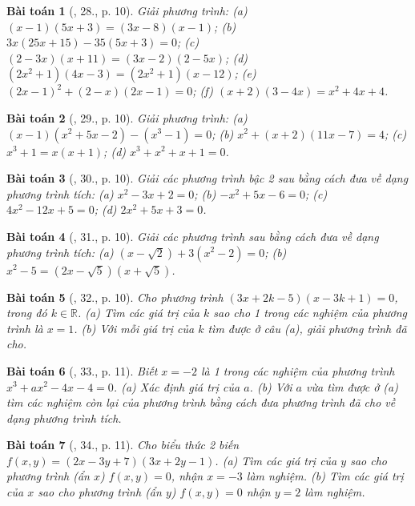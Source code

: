 \documentclass{article}
\newtheorem{baitoan}{Bài toán}
\begin{document}
\begin{baitoan}[\cite{SBT_Toan_8_tap_2}, 28., p. 10]
	Giải phương trình: (a) $(x - 1)(5x + 3) = (3x - 8)(x - 1)$; (b) $3x(25x + 15) - 35(5x + 3) = 0$; (c) $(2 - 3x)(x + 11) = (3x - 2)(2 - 5x)$; (d) $(2x^2 + 1)(4x - 3) = (2x^2 + 1)(x - 12)$; (e) $(2x - 1)^2 + (2 - x)(2x - 1) = 0$; (f) $(x + 2)(3 - 4x) = x^2 + 4x + 4$.
\end{baitoan}

\begin{baitoan}[\cite{SBT_Toan_8_tap_2}, 29., p. 10]
	Giải phương trình: (a) $(x - 1)(x^2 + 5x - 2) - (x^3 - 1) = 0$; (b) $x^2 + (x + 2)(11x - 7) = 4$; (c) $x^3 + 1 = x(x + 1)$; (d) $x^3 + x^2 + x + 1 = 0$.
\end{baitoan}

\begin{baitoan}[\cite{SBT_Toan_8_tap_2}, 30., p. 10]
	Giải các phương trình bậc 2 sau bằng cách đưa về dạng phương trình tích: (a) $x^2 - 3x + 2 = 0$; (b) $-x^2 + 5x - 6 = 0$; (c) $4x^2 - 12x + 5 = 0$; (d) $2x^2 + 5x + 3 = 0$.
\end{baitoan}

\begin{baitoan}[\cite{SBT_Toan_8_tap_2}, 31., p. 10]
	Giải các phương trình sau bằng cách đưa về dạng phương trình tích: (a) $(x - \sqrt{2}) + 3(x^2 - 2) = 0$; (b) $x^2 - 5 = (2x - \sqrt{5})(x + \sqrt{5})$.
\end{baitoan}

\begin{baitoan}[\cite{SBT_Toan_8_tap_2}, 32., p. 10]
	Cho phương trình $(3x + 2k - 5)(x - 3k + 1) = 0$, trong đó $k\in\mathbb{R}$. (a) Tìm các giá trị của $k$ sao cho 1 trong các nghiệm của phương trình là $x = 1$. (b) Với mỗi giá trị của $k$ tìm được ở câu (a), giải phương trình đã cho.
\end{baitoan}

\begin{baitoan}[\cite{SBT_Toan_8_tap_2}, 33., p. 11]
	Biết $x = -2$ là 1 trong các nghiệm của phương trình $x^3 + ax^2 - 4x - 4 = 0$. (a) Xác định giá trị của $a$. (b) Với $a$ vừa tìm được ở (a) tìm các nghiệm còn lại của phương trình bằng cách đưa phương trình đã cho về dạng phương trình tích.
\end{baitoan}

\begin{baitoan}[\cite{SBT_Toan_8_tap_2}, 34., p. 11]
	Cho biểu thức 2 biến $f(x,y) = (2x - 3y + 7)(3x + 2y - 1)$. (a) Tìm các giá trị của $y$ sao cho phương trình (ẩn $x$) $f(x,y) = 0$, nhận $x = -3$ làm nghiệm. (b) Tìm các giá trị của $x$ sao cho phương trình (ẩn $y$) $f(x,y) = 0$ nhận $y = 2$ làm nghiệm.
\end{baitoan}
\end{document}
